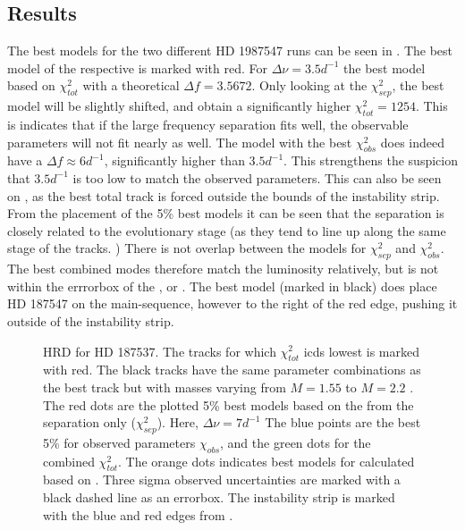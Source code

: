 \subsection{Results}
The best models for the two different HD 1987547 runs can be seen in . The best model of the respective \chis is marked with red. For $\Delta \nu=3.5 d^{-1}$ the best model based on $\chi_{tot}^2$ with a theoretical $\Delta f = 3.5672$. Only looking at the $\chi_{sep}^2$, the best model will be slightly shifted, and obtain a significantly higher $\chi_{tot}^2=1254$. This is indicates that if the large frequency separation fits well, the observable parameters will not fit nearly as well. The model with the best $\chi_{obs}^2$ does indeed have a $\Delta f \approx 6d^{-1}$, significantly higher than $3.5d^{-1}$. This strengthens the suspicion that $3.5 d^{-1}$ is too low to match the observed parameters. This can also be seen on , as the best total track is forced outside the bounds of the instability strip.  From the placement of the 5\% best models it can be seen that the separation is closely related to the evolutionary stage (as they tend to line up along the same stage of the tracks. ) There is not overlap between the models for $\chi_{sep}^2$ and $\chi_{obs}^2$. The best combined modes therefore match the luminosity relatively, but is not within the errrorbox of the \teff, or \lum. The best model (marked in black) does place HD 187547 on the main-sequence, however to the right of the red edge, pushing it outside of the instability strip. 
\begin{figure}[htbp]
	\centering
	\caption{HRD for HD 187537. The tracks for which $\chi_{tot}^2$ icds lowest is marked with red. The black tracks have the same parameter combinations as the best track but with masses varying from $M=1.55$ to $M=2.2$ \msun. The red dots are the plotted 5\% best models based on the \chis from the separation only ($\chi_{sep}^2$).  Here, $\Delta \nu = 7d^{-1}$ The blue points are the best 5\% for observed parameters $\chi_{obs}$, and the green dots for the combined $\chi_{tot}^2$. The orange dots indicates best models for \chis calculated based on \lum. Three sigma observed uncertainties are marked with a black dashed line as an errorbox. The instability strip is marked with the blue and red edges from \citet{murphy2019gaia}.}
	\label{finalsuper}
\end{figure}
